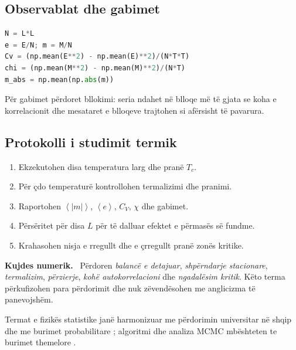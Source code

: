 \documentclass[11pt,oneside,openany]{book}
\newcommand{\avg}[1]{\left\langle #1\right\rangle}
\newenvironment{kujdes}{\par\medskip\noindent\textbf{Kujdes numerik.}\ }{\par\medskip}
\begin{document}
\subsection{Observablat dhe gabimet}
\begin{lstlisting}[language=Python]
N = L*L
e = E/N; m = M/N
Cv = (np.mean(E**2) - np.mean(E)**2)/(N*T*T)
chi = (np.mean(M**2) - np.mean(M)**2)/(N*T)
m_abs = np.mean(np.abs(m))
\end{lstlisting}
Për gabimet përdoret bllokimi: seria ndahet në blloqe më të gjata se koha e korrelacionit dhe mesataret e blloqeve trajtohen si afërsisht të pavarura.

\subsection{Protokolli i studimit termik}
\begin{enumerate}
\item Ekzekutohen disa temperatura larg dhe pranë $T_c$.
\item Për çdo temperaturë kontrollohen termalizimi dhe pranimi.
\item Raportohen $\avg{|m|}$, $\avg e$, $C_V$, $\chi$ dhe gabimet.
\item Përsëritet për disa $L$ për të dalluar efektet e përmasës së fundme.
\item Krahasohen nisja e rregullt dhe e çrregullt pranë zonës kritike.
\end{enumerate}

\begin{kujdes}
Përdoren \emph{balancë e detajuar}, \emph{shpërndarje stacionare}, \emph{termalizim}, \emph{përzierje}, \emph{kohë autokorrelacioni} dhe \emph{ngadalësim kritik}. Këto terma përkufizohen para përdorimit dhe nuk zëvendësohen me anglicizma të panevojshëm.
\end{kujdes}

Termat e fizikës statistike janë harmonizuar me përdorimin universitar në shqip dhe me burimet probabilitare \cite{capollari,butka}; algoritmi dhe analiza MCMC mbështeten te burimet themelore \cite{metropolis,hastings,krauth,robert,walter}.



\end{document}
